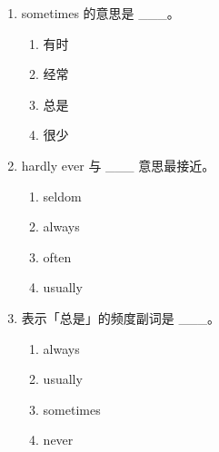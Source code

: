 \documentclass[11pt,a4paper]{ctexart}
\begin{document}
\begin{enumerate}[leftmargin=*,itemsep=4pt]
\begin{enumerate}[label=\Alph*.,leftmargin=2em,itemsep=1pt,topsep=2pt]
\item often > usually > always
\end{enumerate}
\item sometimes 的意思是 \_\_\_。
\begin{enumerate}[label=\Alph*.,leftmargin=2em,itemsep=1pt,topsep=2pt]
\item 有时
\item 经常
\item 总是
\item 很少
\end{enumerate}
\item hardly ever 与 \_\_\_ 意思最接近。
\begin{enumerate}[label=\Alph*.,leftmargin=2em,itemsep=1pt,topsep=2pt]
\item seldom
\item always
\item often
\item usually
\end{enumerate}
\item 表示「总是」的频度副词是 \_\_\_。
\begin{enumerate}[label=\Alph*.,leftmargin=2em,itemsep=1pt,topsep=2pt]
\item always
\item usually
\item sometimes
\item never
\end{enumerate}
\end{enumerate}
\end{document}
